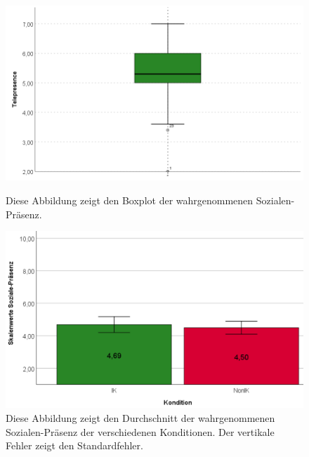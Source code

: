 \documentclass[a4paper,11pt]{article}%
\renewcommand{\\}{\vspace*{0.5\baselineskip} \newline}
\begin{document}
		\begin{figure}[H]
   \begin{minipage}[t]{.5\linewidth} %
      \includegraphics[width=\linewidth]{Abbildungen/AuswertungDiagramme/BP_Telepresence.png}
      \caption[Boxplot der wahrgenommenen Sozialen-Präsenz]{Diese Abbildung zeigt den Boxplot der wahrgenommenen Sozialen-Präsenz.}
            \label{BP_SocialPresence}
   \end{minipage}
   \hspace{.02\linewidth}%
   \begin{minipage}[t]{.5\linewidth} %
     \includegraphics[width=\linewidth]{Abbildungen/AuswertungDiagramme/SD_SocialPresence_Mittelwerte.png}
      \caption[Durchschnittlich der wahrgenommenen Sozialen-Präsenz]{Diese Abbildung zeigt den Durchschnitt der wahrgenommenen Sozialen-Präsenz der verschiedenen Konditionen. Der vertikale Fehler zeigt den Standardfehler.}
       \label{SD_SocialPresence_Mittelwerte}
   \end{minipage}
\end{figure}
\end{document}
